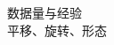 \documentclass{beamer}%
\begin{document}
\begin{frame}
    \vspace{0.2cm}

    数据量与经验\\
    平移、旋转、形态


\end{frame}


\begin{frame}




\end{frame}
\end{document}

